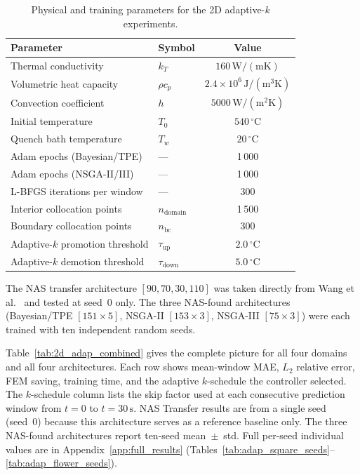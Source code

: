 \begin{table}[H]
\centering
\caption{Physical and training parameters for the 2D adaptive-$k$ experiments.}
\label{tab:2d_adap_params}
\small
\begin{tabular}{llc}
\toprule
Parameter & Symbol & Value \\
\midrule
Thermal conductivity     & $k_T$      & $160\,\mathrm{W/(mK)}$ \\
Volumetric heat capacity & $\rho c_p$ & $2.4\times10^6\,\mathrm{J/(m^3K)}$ \\
Convection coefficient   & $h$        & $5000\,\mathrm{W/(m^2K)}$ \\
Initial temperature      & $T_0$      & $540\,^\circ\mathrm{C}$ \\
Quench bath temperature  & $T_w$      & $20\,^\circ\mathrm{C}$ \\
\midrule
Adam epochs (Bayesian/TPE)    & --- & 1\,000 \\
Adam epochs (NSGA-II/III)     & --- & 1\,000 \\
L-BFGS iterations per window  & --- & 300 \\
Interior collocation points   & $n_\mathrm{domain}$ & 1\,500 \\
Boundary collocation points   & $n_\mathrm{bc}$     & 300 \\
Adaptive-$k$ promotion threshold  & $\tau_\mathrm{up}$   & $2.0\,^\circ\mathrm{C}$ \\
Adaptive-$k$ demotion threshold   & $\tau_\mathrm{down}$ & $5.0\,^\circ\mathrm{C}$ \\
\bottomrule
\end{tabular}
\end{table}

The NAS transfer architecture $[90,70,30,110]$ was taken directly from Wang
et al.~\cite{wang2023} and tested at seed~0 only.
The three NAS-found architectures (Bayesian/TPE $[151{\times}5]$, NSGA-II
$[153{\times}3]$, NSGA-III $[75{\times}3]$) were each trained with ten
independent random seeds.

Table~\ref{tab:2d_adap_combined} gives the complete picture for all four
domains and all four architectures.
Each row shows mean-window MAE, $L_2$ relative error, FEM saving, training
time, and the adaptive $k$-schedule the controller selected.
The $k$-schedule column lists the skip factor used at each consecutive
prediction window from $t=0$ to $t=30\,\mathrm{s}$.
NAS Transfer results are from a single seed (seed~0) because this architecture
serves as a reference baseline only.
The three NAS-found architectures report ten-seed mean~$\pm$~std.
Full per-seed individual values are in Appendix~\ref{app:full_results}
(Tables~\ref{tab:adap_square_seeds}--\ref{tab:adap_flower_seeds}).

